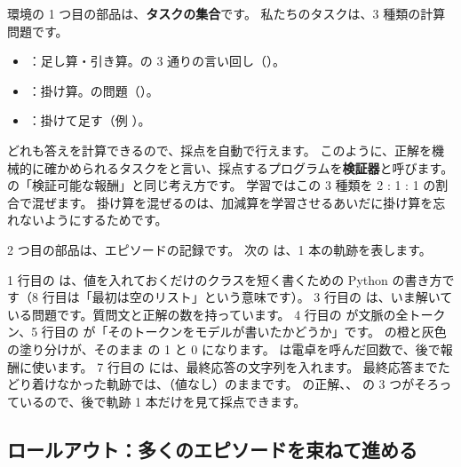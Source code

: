 環境の 1 つ目の部品は、\textbf{タスクの集合}です。
私たちのタスクは、3 種類の計算問題です。
\begin{itemize}
\item {}：足し算・引き算。の 3 通りの言い回し（）。
\item {}：掛け算。の問題（）。
\item {}：掛けて足す（例 ）。
\end{itemize}
どれも答えを計算できるので、採点を自動で行えます。
このように、正解を機械的に確かめられるタスクをと言い、採点するプログラムを\textbf{検証器}と呼びます。
の「検証可能な報酬」と同じ考え方です。
学習ではこの 3 種類を 2 : 1 : 1 の割合で混ぜます。
掛け算を混ぜるのは、加減算を学習させるあいだに掛け算を忘れないようにするためです。

2 つ目の部品は、エピソードの記録です。
次の  は、1 本の軌跡を表します。


1 行目の  は、値を入れておくだけのクラスを短く書くための Python の書き方です（8 行目は「最初は空のリスト」という意味です）。
3 行目の  は、いま解いている問題です。質問文と正解の数を持っています。
4 行目の  が文脈の全トークン、5 行目の  が「そのトークンをモデルが書いたかどうか」です。
の橙と灰色の塗り分けが、そのまま  の 1 と 0 になります。
 は電卓を呼んだ回数で、後で報酬に使います。
7 行目の  には、最終応答の文字列を入れます。
最終応答までたどり着けなかった軌跡では、（値なし）のままです。
 の正解、、 の 3 つがそろっているので、後で軌跡 1 本だけを見て採点できます。

\subsection{ロールアウト：多くのエピソードを束ねて進める}\label{sec:arl-rollout}

